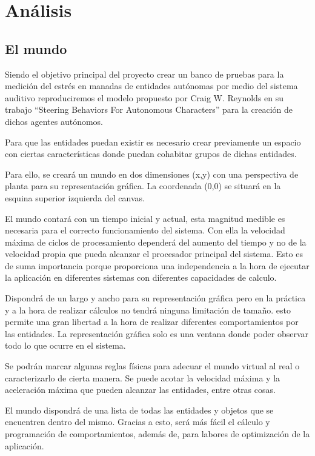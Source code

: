 \section{Análisis}
\label{section:analisis}

\subsection{El mundo}
Siendo el objetivo principal del proyecto crear un banco de pruebas para la medición del estrés en manadas de entidades autónomas por medio del sistema auditivo reproduciremos el modelo propuesto por Craig W. Reynolds en su trabajo “Steering Behaviors For Autonomous Characters” para la creación de dichos agentes autónomos.
 
Para que las entidades puedan existir es necesario crear previamente un espacio con ciertas características donde puedan cohabitar grupos de dichas entidades.
 
Para ello, se creará un mundo en dos dimensiones (x,y) con una perspectiva de planta para su representación gráfica. La coordenada (0,0) se situará en la esquina superior izquierda del canvas.
 
El mundo contará con un tiempo inicial y actual, esta magnitud medible es necesaria para el correcto funcionamiento del sistema. Con ella la velocidad máxima de ciclos de procesamiento dependerá del aumento del tiempo y no de la velocidad propia que pueda alcanzar el procesador principal del sistema. Esto es de suma importancia porque proporciona una independencia a la hora de ejecutar la aplicación en diferentes sistemas con diferentes capacidades de calculo.
 
Dispondrá de un largo y ancho para su representación gráfica pero en la práctica y a la hora de realizar cálculos no tendrá ninguna limitación de tamaño. esto permite una gran libertad a la hora de realizar diferentes comportamientos por las entidades. La representación gráfica solo es una ventana donde poder observar todo lo que ocurre en el sistema.
 
Se podrán marcar algunas reglas físicas para adecuar el mundo virtual al real o caracterizarlo de cierta manera. Se puede acotar la velocidad máxima y la aceleración máxima que pueden alcanzar las entidades, entre otras cosas.
 
El mundo dispondrá de una lista de todas las entidades y objetos que se encuentren dentro del mismo. Gracias a esto, será más fácil el cálculo y programación de comportamientos, además de, para labores de optimización de la aplicación.
 
